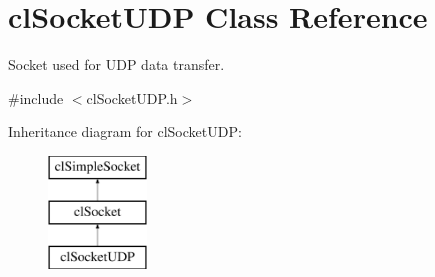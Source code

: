 \hypertarget{classcl_socket_u_d_p}{
\section{clSocketUDP Class Reference}
\label{classcl_socket_u_d_p}
}


Socket used for UDP data transfer.  




{\ttfamily \#include $<$clSocketUDP.h$>$}

Inheritance diagram for clSocketUDP:\begin{figure}[H]
\begin{center}
\leavevmode
\includegraphics[height=3.000000cm]{classcl_socket_u_d_p}
\end{center}
\end{figure}

